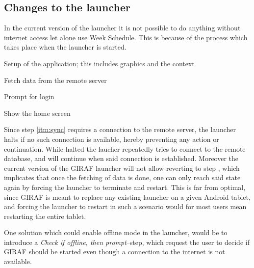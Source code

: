 \subsection{Changes to the launcher}
\label{sub:changes_to_the_launcher}
In the current version of the launcher it is not possible to do anything without internet access let alone use Week Schedule.
This is because of the process which takes place when the launcher is started.
\begin{enumberate}
    \item Setup of the application; this includes graphics and the context
    \item \label{itm:sync} Fetch data from the remote server
    \item Prompt for login
    \item Show the home screen
\end{enumberate}
Since step \ref{itm:sync} requires a connection to the remote server, the launcher halts if no such connection is available, hereby preventing any action or continuation.
While halted the laucher repeatedly tries to connect to the remote database, and will continue when said connection is established.
Moreover the current version of the GIRAF launcher will not allow reverting to step \label{imt:sync}, which implicates that once the fetching of data is done, one can only reach said state again by forcing the launcher to terminate and restart.
This is far from optimal, since GIRAF is meant to replace any existing launcher on a given Android tablet, and forcing the launcher to restart in such a scenario would for most users mean restarting the entire tablet.

One solution which could enable offline mode in the launcher, would be to introduce a \textit{Check if offline, then prompt}--step, which request the user to decide if GIRAF should be started even though a connection to the internet is not available.
